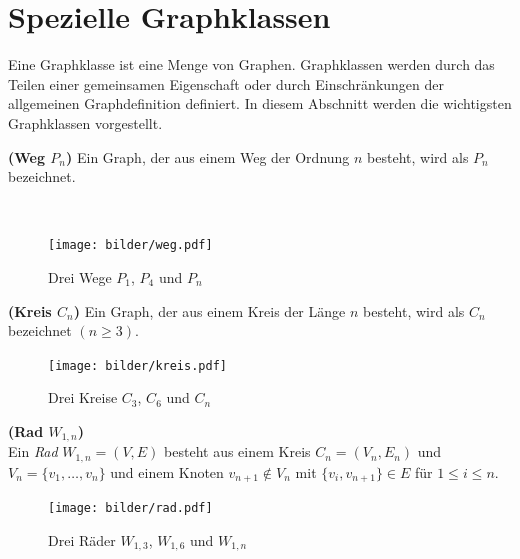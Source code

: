 \section{Spezielle Graphklassen}
\vspace{-3mm}
Eine Graphklasse ist eine Menge von Graphen. Graphklassen werden durch das Teilen einer gemeinsamen Eigenschaft oder durch Einschränkungen der allgemeinen Graphdefinition definiert. In diesem Abschnitt werden die wichtigsten Graphklassen vorgestellt.

\begin{defi}{\textbf{(Weg $P_n$)}}\newline
Ein Graph, der aus einem Weg der Ordnung $n$ besteht, wird als $P_n$ bezeichnet. \end{defi}
\vspace{-13mm}
~\linebreak
\begin{figure}[h!]
		\centering 		 
   \texttt{[image: bilder/weg.pdf]}
	\caption{Drei Wege $P_1$, $P_4$ und $P_n$}
  	 \end{figure}
\vspace{-7mm}
\begin{defi}{\textbf{(Kreis $C_n$)}}\newline
Ein Graph, der aus einem Kreis der Länge $n$ besteht, wird als $C_n$ bezeichnet $(n \geq 3)$. \end{defi}
\vspace{-5mm}
\begin{figure}[h!]
		\centering 		 
   \texttt{[image: bilder/kreis.pdf]}
	\caption{Drei Kreise $C_3$, $C_6$ und $C_n$}
  	 \end{figure}
\vspace{-4mm}
\begin{defi}{\textbf{(Rad $W_{1,n}$)}}\\
Ein \emph{Rad} $W_{1,n}=(V,E)$ besteht aus einem Kreis $C_n=(V_n,E_n)$ und $V_n=\{v_1, \ldots ,v_n\}$ und einem Knoten $v_{n+1} \notin V_n$ mit $\{v_i, v_{n+1} \} \in E$ für $1 \leq i \leq n$. 
\end{defi}
\vspace{-5mm}
\begin{figure}[h!]
		\centering 		 
   \texttt{[image: bilder/rad.pdf]}
	\caption{Drei Räder $W_{1,3}$, $W_{1,6}$ und $W_{1,n}$}
  	 \end{figure}
  	 
